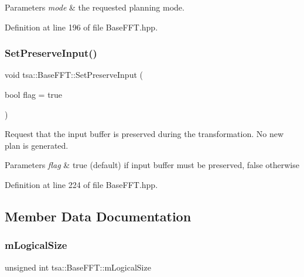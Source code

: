 \begin{DoxyParams}{Parameters}
{\em mode} & the requested planning mode. \\
\hline
\end{DoxyParams}


Definition at line 196 of file Base\+F\+F\+T.\+hpp.

\mbox{\label{classtsa_1_1_base_f_f_t_a5b1e2f36dbdfe197aa6c74d1cf963f40}} 
\subsubsection{\texorpdfstring{Set\+Preserve\+Input()}{SetPreserveInput()}}
{\footnotesize\ttfamily void tsa\+::\+Base\+F\+F\+T\+::\+Set\+Preserve\+Input (\begin{DoxyParamCaption}\item[{bool}]{flag = {\ttfamily true} }\end{DoxyParamCaption})\hspace{0.3cm}{\ttfamily [inline]}}

Request that the input buffer is preserved during the transformation. No new plan is generated.


\begin{DoxyParams}{Parameters}
{\em flag} & true (default) if input buffer must be preserved, false otherwise \\
\hline
\end{DoxyParams}


Definition at line 224 of file Base\+F\+F\+T.\+hpp.



\subsection{Member Data Documentation}
\mbox{\label{classtsa_1_1_base_f_f_t_a171c71011fea314f23633b1816771d98}} 
\subsubsection{\texorpdfstring{m\+Logical\+Size}{mLogicalSize}}
{\footnotesize\ttfamily unsigned int tsa\+::\+Base\+F\+F\+T\+::m\+Logical\+Size\hspace{0.3cm}{\ttfamily [protected]}}

